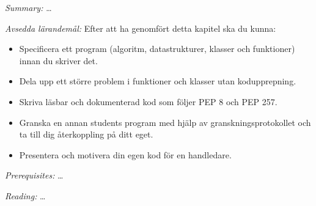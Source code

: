 
\emph{Summary:}
\dots

\emph{Avsedda lärandemål:}
Efter att ha genomfört detta kapitel ska du kunna:
\begin{itemize}
  \item Specificera ett program (algoritm, datastrukturer, klasser och
    funktioner) innan du skriver det. %
  \item Dela upp ett större problem i funktioner och klasser utan
    kodupprepning. %
  \item Skriva läsbar och dokumenterad kod som följer PEP 8 och
    PEP 257. %
  \item Granska en annan students program med hjälp av
    granskningsprotokollet och ta till dig återkoppling på ditt
    eget. %
  \item Presentera och motivera din egen kod för en handledare. %
\end{itemize}

\emph{Prerequisites:}
\dots

\emph{Reading:}
\dots

